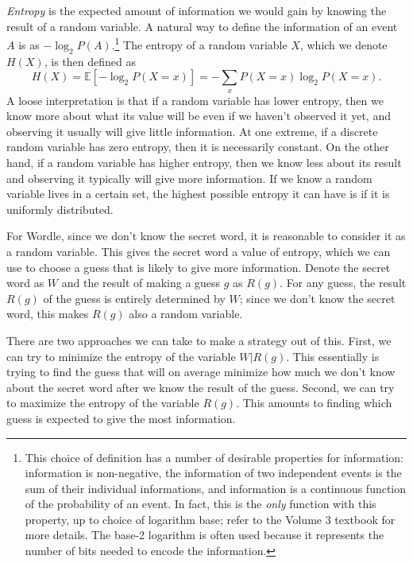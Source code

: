 \emph{Entropy} is the expected amount of information we would gain by knowing the result of a random variable.
A natural way to define the information of an event \(A\) is as \(-\log_2 P(A)\).\footnote{This choice of definition has a number of desirable properties for information: information is non-negative, the information of two independent events is the sum of their individual informations, and information is a continuous function of the probability of an event.
In fact, this is the \emph{only} function with this property, up to choice of logarithm base; refer to the Volume 3 textbook for more details.
The base-2 logarithm is often used because it represents the number of bits needed to encode the information.}
The entropy of a random variable \(X\), which we denote \(H(X)\), is then defined as
\[
H(X)= \mathbb{E}\left[-\log_2 P(X=x)\right]=-\sum_x P(X=x)\log_2 P(X=x).
\] 
A loose interpretation is that if a random variable has lower entropy, then we know more about what its value will be even if we haven't observed it yet, and observing it usually will give little information.
At one extreme, if a discrete random variable has zero entropy, then it is necessarily constant.%
On the other hand, if a random variable has higher entropy, then we know less about its result and observing it typically will give more information.
If we know a random variable lives in a certain set, the highest possible entropy it can have is if it is uniformly distributed.

For Wordle, since we don't know the secret word, it is reasonable to consider it as a random variable.
This gives the secret word a value of entropy, which we can use to choose a guess that is likely to give more information.
Denote the secret word as \(W\) and the result of making a guess \(g\) as \(R(g)\).
For any guess, the result $R(g)$ of the guess is entirely determined by $W$; since we don't know the secret word, this makes $R(g)$ also a random variable.

There are two approaches we can take to make a strategy out of this.
First, we can try to minimize the entropy of the variable \(W|R(g)\).
This essentially is trying to find the guess that will on average minimize how much we don't know about the secret word after we know the result of the guess.
Second, we can try to maximize the entropy of the variable \(R(g)\).
This amounts to finding which guess is expected to give the most information.

